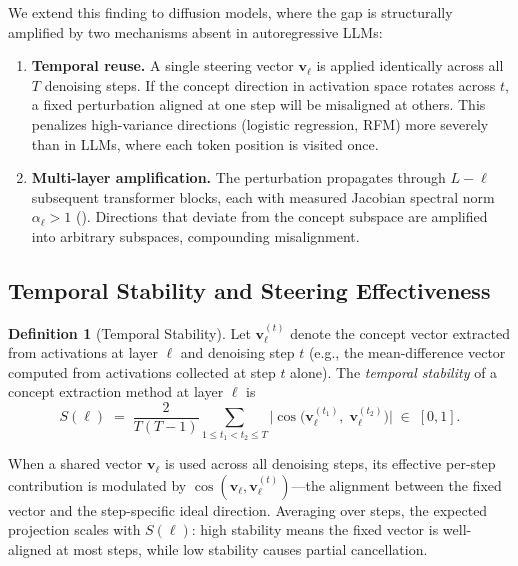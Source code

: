 \documentclass{article}
\theoremstyle{definition}
\newtheorem{definition}[theorem]{Definition}
\newcommand{\bv}{\mathbf{v}}
\begin{document}
We extend this finding to diffusion models, where the gap is structurally amplified by two mechanisms absent in autoregressive LLMs:
\begin{enumerate}[leftmargin=*,nosep]
  \item \textbf{Temporal reuse.} A single steering vector $\bv_\ell$ is applied identically across all $T$ denoising steps. If the concept direction in activation space rotates across $t$, a fixed perturbation aligned at one step will be misaligned at others. This penalizes high-variance directions (logistic regression, RFM) more severely than in LLMs, where each token position is visited once.
  \item \textbf{Multi-layer amplification.} The perturbation propagates through $L - \ell$ subsequent transformer blocks, each with measured Jacobian spectral norm $\alpha_\ell > 1$ (). Directions that deviate from the concept subspace are amplified into arbitrary subspaces, compounding misalignment.
\end{enumerate}

\subsection{Temporal Stability and Steering Effectiveness}

\begin{definition}[Temporal Stability]
\label{def:stability}
Let $\bv_\ell^{(t)}$ denote the concept vector extracted from activations at layer $\ell$ and denoising step $t$ (e.g., the mean-difference vector computed from activations collected at step $t$ alone).
The \emph{temporal stability} of a concept extraction method at layer $\ell$ is
\begin{equation}
  S(\ell) \;=\; \frac{2}{T(T-1)} \sum_{1 \le t_1 < t_2 \le T} \bigl|\cos\!\bigl(\bv_\ell^{(t_1)},\; \bv_\ell^{(t_2)}\bigr)\bigr| \;\in\; [0, 1].
  \label{eq:stability}
\end{equation}
\end{definition}

When a shared vector $\bv_\ell$ is used across all denoising steps, its effective per-step contribution is modulated by $\cos(\bv_\ell, \bv_\ell^{(t)})$---the alignment between the fixed vector and the step-specific ideal direction.
Averaging over steps, the expected projection scales with $S(\ell)$: high stability means the fixed vector is well-aligned at most steps, while low stability causes partial cancellation.
\end{document}
